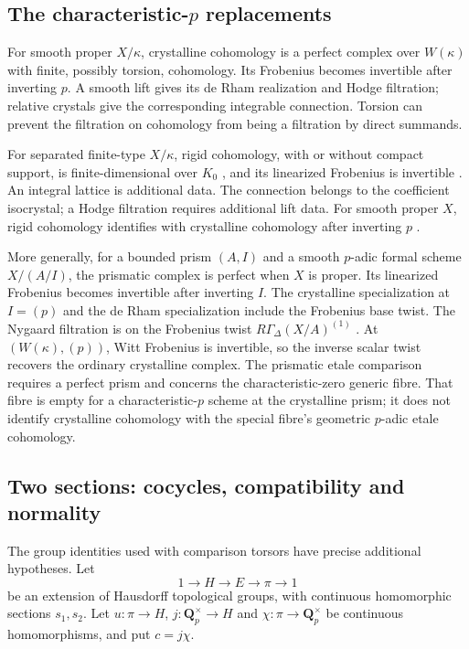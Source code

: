 \documentclass[11pt]{article}
\theoremstyle{definition}\newtheorem{definition}[theorem]{Definition}
\theoremstyle{remark}\newtheorem{remark}[theorem]{Remark}
\newcommand{\Q}{\mathbf Q}\newcommand{\Z}{\mathbf Z}
\begin{document}
\subsection{The characteristic-\texorpdfstring{$p$}{p} replacements}
For smooth proper $X/\kappa$, crystalline cohomology is a perfect complex over $W(\kappa)$ with finite, possibly torsion, cohomology. Its Frobenius becomes invertible after inverting $p$. A smooth lift gives its de Rham realization and Hodge filtration; relative crystals give the corresponding integrable connection. Torsion can prevent the filtration on cohomology from being a filtration by direct summands.

For separated finite-type $X/\kappa$, rigid cohomology, with or without compact support, is finite-dimensional over $K_0$ \cite[Theorems~1.2.1--1.2.2, pp.~3--4]{KedlayaLocal}, and its linearized Frobenius is invertible \cite[Proposition~6.2 and Remark~6.3, p.~12]{DegliseLocal}. An integral lattice is additional data. The connection belongs to the coefficient isocrystal; a Hodge filtration requires additional lift data. For smooth proper $X$, rigid cohomology identifies with crystalline cohomology after inverting $p$ \cite[Proposition~1.9, author p.~13]{BerthelotLocal}.

More generally, for a bounded prism $(A,I)$ and a smooth $p$-adic formal scheme $X/(A/I)$, the prismatic complex is perfect when $X$ is proper. Its linearized Frobenius becomes invertible after inverting $I$. The crystalline specialization at $I=(p)$ and the de Rham specialization include the Frobenius base twist. The Nygaard filtration is on the Frobenius twist $R\Gamma_\Delta(X/A)^{(1)}$ \cite[Theorem~1.8, pp.~4--5; Theorem~1.16, p.~8]{PrismsLocal}. At $(W(\kappa),(p))$, Witt Frobenius is invertible, so the inverse scalar twist recovers the ordinary crystalline complex. The prismatic etale comparison requires a perfect prism and concerns the characteristic-zero generic fibre. That fibre is empty for a characteristic-$p$ scheme at the crystalline prism; it does not identify crystalline cohomology with the special fibre's geometric $p$-adic etale cohomology.

\subsection{Two sections: cocycles, compatibility and normality}
The group identities used with comparison torsors have precise additional hypotheses. Let
\[
 1\longrightarrow H\longrightarrow E\longrightarrow\pi\longrightarrow1
\]
be an extension of Hausdorff topological groups, with continuous homomorphic sections $s_1,s_2$. Let $u:\pi\to H$, $j:\Q_p^\times\to H$ and $\chi:\pi\to\Q_p^\times$ be continuous homomorphisms, and put $c=j\chi$.
\end{document}
